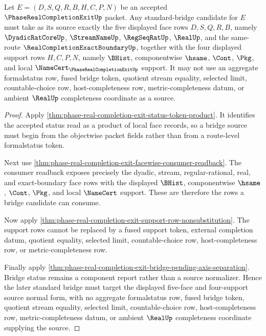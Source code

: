 \begin{theorem}
\label{thm:phase-real-completion-exit-standard-bridge-source-normal-form}
Let $E=(D,S,Q,R,B,H,C,P,N)$ be an accepted $\PhaseRealCompletionExitUp$ packet. Any standard-bridge candidate for $E$ must take as its source exactly the five displayed face rows $D,S,Q,R,B$, namely $\DyadicRatCoreUp$, $\StreamNameUp$, $\RegSeqRatUp$, $\RealUp$, and the same-route $\RealCompletionExactBoundaryUp$, together with the four displayed support rows $H,C,P,N$, namely $\BHist$, componentwise $\hsame$, $\Cont$, $\Pkg$, and local $\NameCert_{\PhaseRealCompletionExitUp}$ support. It may not use an aggregate formalstatus row, fused bridge token, quotient stream equality, selected limit, countable-choice row, host-completeness row, metric-completeness datum, or ambient $\RealUp$ completeness coordinate as a source.
\end{theorem}
\begin{proof}
Apply \autoref{thm:phase-real-completion-exit-status-token-product}. It identifies the accepted status read as a product of local face records, so a bridge source must begin from the objectwise packet fields rather than from a route-level formalstatus token.

Next use \autoref{thm:phase-real-completion-exit-facewise-consumer-readback}. The consumer readback exposes precisely the dyadic, stream, regular-rational, real, and exact-boundary face rows with the displayed $\BHist$, componentwise $\hsame$, $\Cont$, $\Pkg$, and local $\NameCert$ support. These are therefore the rows a bridge candidate can consume.

Now apply \autoref{thm:phase-real-completion-exit-support-row-nonsubstitution}. The support rows cannot be replaced by a fused support token, external completion datum, quotient equality, selected limit, countable-choice row, host-completeness row, or metric-completeness row.

Finally apply \autoref{thm:phase-real-completion-exit-bridge-pending-axis-separation}. Bridge status remains a component report rather than a source normalizer. Hence the later standard bridge must target the displayed five-face and four-support source normal form, with no aggregate formalstatus row, fused bridge token, quotient stream equality, selected limit, countable-choice row, host-completeness row, metric-completeness datum, or ambient $\RealUp$ completeness coordinate supplying the source.
\end{proof}

